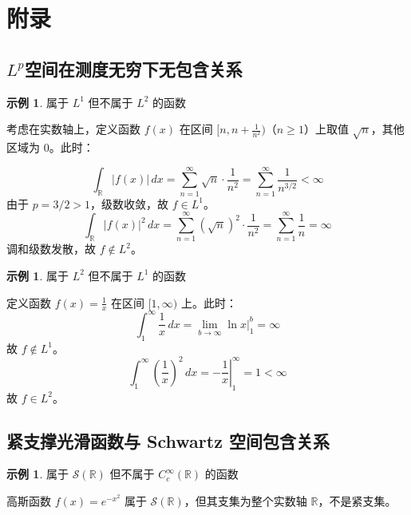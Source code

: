 \documentclass[12pt,a4paper]{article}
\theoremstyle{plain}
\theoremstyle{definition}
\newtheorem{example}[theorem]{示例}
\theoremstyle{remark}
\begin{document}
\newpage

\appendix
\section{附录}\label{app:first}

\subsection{$L^p$空间在测度无穷下无包含关系}
\begin{example}{属于 \( L^1 \) 但不属于 \( L^2 \) 的函数}
	
考虑在实数轴上，定义函数 \( f(x) \) 在区间 \([n, n + \frac{1}{n^2})\)（\( n \geq 1 \)）上取值 \( \sqrt{n} \)，其他区域为 0。此时：

\[
	\int_{\mathbb{R}} |f(x)| \, dx = \sum_{n=1}^\infty \sqrt{n} \cdot \frac{1}{n^2} 
	= \sum_{n=1}^\infty \frac{1}{n^{3/2}} < \infty
\]
由于 \( p = 3/2 > 1 \)，级数收敛，故 \( f \in L^1 \)。
\[
	\int_{\mathbb{R}} |f(x)|^2 \, dx = \sum_{n=1}^\infty (\sqrt{n})^2 \cdot \frac{1}{n^2} = \sum_{n=1}^\infty \frac{1}{n} = \infty
\]
调和级数发散，故 \( f \notin L^2 \)。
\end{example}



\begin{example}{属于 \( L^2 \) 但不属于 \( L^1 \) 的函数}

定义函数 \( f(x) = \frac{1}{x} \) 在区间 \([1, \infty)\) 上。此时：
\[
\int_{1}^\infty \frac{1}{x} \, dx = \lim_{b \to \infty} \ln x \Big|_{1}^{b} 	= \infty
\]
故 \( f \notin L^1 \)。
\[
	\int_{1}^\infty \left(\frac{1}{x}\right)^2 \, dx = \left. -\frac{1}{x} \right|_{1}^{\infty} = 1 < \infty
\]
故 \( f \in L^2 \)。

\end{example}




\subsection{紧支撑光滑函数与 Schwartz 空间包含关系}
\begin{example}属于 \(\mathcal{S}(\mathbb{R})\) 但不属于 \(C_c^\infty(\mathbb{R})\) 的函数
	
高斯函数 \( f(x) = e^{-x^2} \) 属于 \(\mathcal{S}(\mathbb{R})\)，但其支集为整个实数轴 \(\mathbb{R}\)，不是紧支集。

\end{example}
\end{document}
